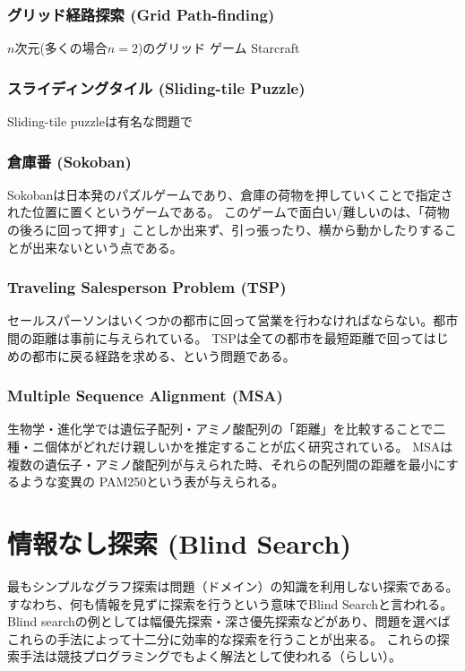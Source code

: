 \documentclass{book}
\begin{document}
\subsection{グリッド経路探索 (Grid Path-finding)}
$n$次元(多くの場合$n=2$)のグリッド
ゲーム
Starcraft


\subsection{スライディングタイル (Sliding-tile Puzzle)}

Sliding-tile puzzleは有名な問題で


\subsection{倉庫番 (Sokoban)}
Sokobanは日本発のパズルゲームであり、倉庫の荷物を押していくことで指定された位置に置くというゲームである。
このゲームで面白い/難しいのは、「荷物の後ろに回って押す」ことしか出来ず、引っ張ったり、横から動かしたりすることが出来ないという点である。

\subsection{Traveling Salesperson Problem (TSP)}

セールスパーソンはいくつかの都市に回って営業を行わなければならない。都市間の距離は事前に与えられている。
TSPは全ての都市を最短距離で回ってはじめの都市に戻る経路を求める、という問題である。

\subsection{Multiple Sequence Alignment (MSA)}

生物学・進化学では遺伝子配列・アミノ酸配列の「距離」を比較することで二種・ニ個体がどれだけ親しいかを推定することが広く研究されている。
MSAは複数の遺伝子・アミノ酸配列が与えられた時、それらの配列間の距離を最小にするような変異の
PAM250という表が与えられる。



\chapter{情報なし探索 (Blind Search)}
\label{ch:blind-search}
最もシンプルなグラフ探索は問題（ドメイン）の知識を利用しない探索である。
すなわち、何も情報を見ずに探索を行うという意味でBlind Searchと言われる。
Blind searchの例としては幅優先探索・深さ優先探索などがあり、問題を選べばこれらの手法によって十二分に効率的な探索を行うことが出来る。
これらの探索手法は競技プログラミングでもよく解法として使われる（らしい）。
\end{document}
